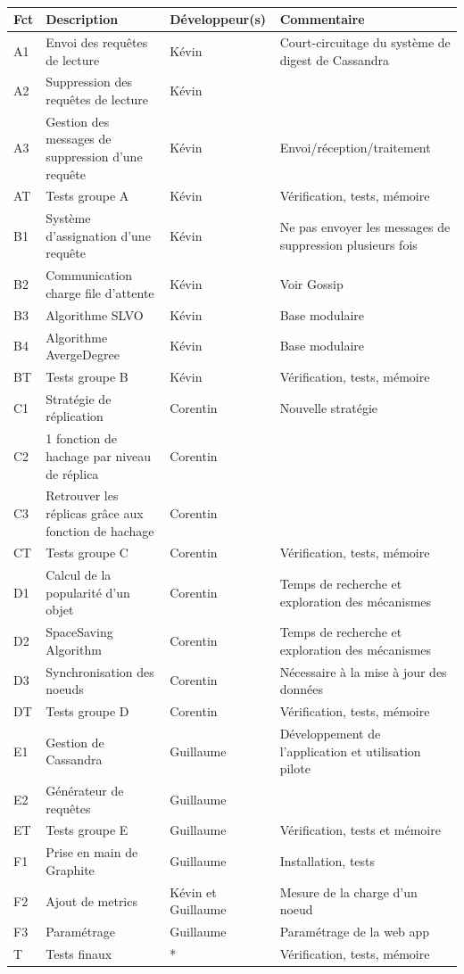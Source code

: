 \documentclass[12pt]{article}
\begin{document}
\paragraph{}
\begin{tabular}{| l | M{5cm} | M{3cm} | M{5.5cm} |}
    \hline
    Fct & Description & Développeur(s) & Commentaire \tabularnewline
    \hline
    A1 & Envoi des requêtes de lecture & Kévin & Court-circuitage du système de digest de Cassandra  \tabularnewline
    \hline
    A2 & Suppression des requêtes de lecture & Kévin &  \tabularnewline
    \hline
    A3 & Gestion des messages de suppression d'une requête & Kévin & Envoi/réception/traitement \tabularnewline
    \hline
    AT & Tests groupe A & Kévin &  Vérification, tests, mémoire \tabularnewline
    \hline 
    \hline
    B1 & Système d'assignation d'une requête & Kévin & Ne pas envoyer les messages de suppression plusieurs fois  \tabularnewline
    \hline
    B2 & Communication charge file d'attente & Kévin & Voir Gossip \tabularnewline
    \hline
    B3 & Algorithme SLVO & Kévin & Base modulaire  \tabularnewline
    \hline
    B4 & Algorithme AvergeDegree & Kévin & Base modulaire  \tabularnewline
    \hline
    BT & Tests groupe B & Kévin &  Vérification, tests, mémoire \tabularnewline
    \hline
    \hline
    C1 & Stratégie de réplication & Corentin  & Nouvelle stratégie \tabularnewline
    \hline
    C2 & 1 fonction de hachage par niveau de réplica & Corentin  &  \tabularnewline
    \hline
    C3 & Retrouver les réplicas grâce aux fonction de hachage & Corentin  &  \tabularnewline
    \hline
    CT & Tests groupe C & Corentin & Vérification, tests, mémoire \tabularnewline
    \hline
    \hline
    D1 & Calcul de la popularité d'un objet & Corentin & Temps de recherche et exploration des mécanismes  \tabularnewline
    \hline
    D2 & SpaceSaving Algorithm & Corentin & Temps de recherche et exploration des mécanismes \tabularnewline
    \hline
    D3 & Synchronisation des noeuds & Corentin & Nécessaire à la mise à jour des données\tabularnewline
    \hline
    DT & Tests groupe D & Corentin & Vérification, tests, mémoire \tabularnewline
    \hline
    \hline
    E1 & Gestion de Cassandra & Guillaume &  Développement de l'application et utilisation pilote \tabularnewline
    \hline
    E2 & Générateur de requêtes &  Guillaume & \tabularnewline
    \hline
    ET & Tests groupe E &  Guillaume &  Vérification, tests et mémoire \tabularnewline
    \hline
    \hline
    F1 & Prise en main de Graphite & Guillaume & Installation, tests \tabularnewline
    \hline
    F2 & Ajout de metrics & Kévin et Guillaume &  Mesure de la charge d'un noeud \tabularnewline
    \hline
    F3 & Paramétrage &  Guillaume &  Paramétrage de la web app \tabularnewline
    \hline
    \hline
    T & Tests finaux & * &  Vérification, tests, mémoire \tabularnewline
    \hline
\end{tabular}
 
\end{document}
